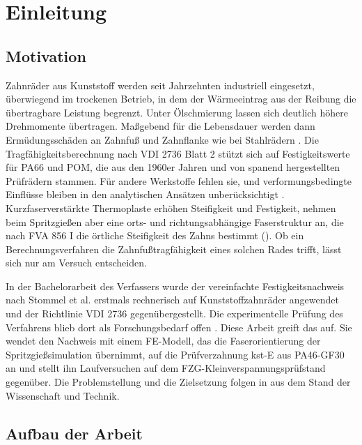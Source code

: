 \chapter{Einleitung}
\label{chap:einleitung}

\section{Motivation}
\label{sec:motivation}

Zahnräder aus Kunststoff werden seit Jahrzehnten industriell eingesetzt, überwiegend im trockenen Betrieb, in dem der Wärmeeintrag aus der Reibung die übertragbare Leistung begrenzt. Unter Ölschmierung lassen sich deutlich höhere Drehmomente übertragen. Maßgebend für die Lebensdauer werden dann Ermüdungsschäden an Zahnfuß und Zahnflanke wie bei Stahlrädern \cite[S.~1]{Has18}. Die Tragfähigkeitsberechnung nach VDI 2736 Blatt 2 stützt sich auf Festigkeitswerte für PA66 und POM, die aus den 1960er Jahren und von spanend hergestellten Prüfrädern stammen. Für andere Werkstoffe fehlen sie, und verformungsbedingte Einflüsse bleiben in den analytischen Ansätzen unberücksichtigt \cite[S.~1 bis 2]{Has18}. Kurzfaserverstärkte Thermoplaste erhöhen Steifigkeit und Festigkeit, nehmen beim Spritzgießen aber eine orts- und richtungsabhängige Faserstruktur an, die nach FVA 856 I die örtliche Steifigkeit des Zahns bestimmt (). Ob ein Berechnungsverfahren die Zahnfußtragfähigkeit eines solchen Rades trifft, lässt sich nur am Versuch entscheiden.

In der Bachelorarbeit des Verfassers wurde der vereinfachte Festigkeitsnachweis nach Stommel et al. erstmals rechnerisch auf Kunststoffzahnräder angewendet und der Richtlinie VDI 2736 gegenübergestellt. Die experimentelle Prüfung des Verfahrens blieb dort als Forschungsbedarf offen \cite[S.~71]{Kuh24}. Diese Arbeit greift das auf. Sie wendet den Nachweis mit einem FE-Modell, das die Faserorientierung der Spritzgießsimulation übernimmt, auf die Prüfverzahnung kst-E aus PA46-GF30 an und stellt ihn Laufversuchen auf dem FZG-Kleinverspannungsprüfstand gegenüber. Die Problemstellung und die Zielsetzung folgen in  aus dem Stand der Wissenschaft und Technik.

\section{Aufbau der Arbeit}
\label{sec:aufbau}

